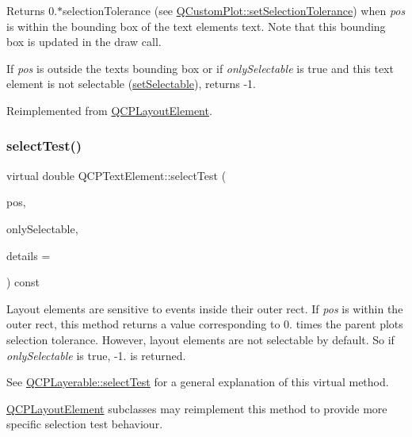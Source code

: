 Returns 0.$\ast$selection\+Tolerance (see \hyperlink{class_q_custom_plot_a4dc31241d7b09680950e19e5f971ed93}{Q\+Custom\+Plot\+::set\+Selection\+Tolerance}) when {\itshape pos} is within the bounding box of the text element\textquotesingle{}s text. Note that this bounding box is updated in the draw call.

If {\itshape pos} is outside the text\textquotesingle{}s bounding box or if {\itshape only\+Selectable} is true and this text element is not selectable (\hyperlink{class_q_c_p_text_element_a3c5f9b1897a036b16495ed3fb8371c55}{set\+Selectable}), returns -\/1.

Reimplemented from \hyperlink{class_q_c_p_layout_element_ae97f483cccedadbf18ea4525ef240ee4}{Q\+C\+P\+Layout\+Element}.

\mbox{\label{class_q_c_p_text_element_a29d2998b50ef369d88ca990b9d3542b3}} 
\subsubsection{\texorpdfstring{select\+Test()}{selectTest()}\hspace{0.1cm}{\footnotesize\ttfamily [2/2]}}
{\footnotesize\ttfamily virtual double Q\+C\+P\+Text\+Element\+::select\+Test (\begin{DoxyParamCaption}\item[{const Q\+PointF \&}]{pos,  }\item[{bool}]{only\+Selectable,  }\item[{Q\+Variant $\ast$}]{details = {} }\end{DoxyParamCaption}) const\hspace{0.3cm}{\ttfamily [virtual]}}

Layout elements are sensitive to events inside their outer rect. If {\itshape pos} is within the outer rect, this method returns a value corresponding to 0. times the parent plot\textquotesingle{}s selection tolerance. However, layout elements are not selectable by default. So if {\itshape only\+Selectable} is true, -\/1. is returned.

See \hyperlink{class_q_c_p_layerable_a04db8351fefd44cfdb77958e75c6288e}{Q\+C\+P\+Layerable\+::select\+Test} for a general explanation of this virtual method.

\hyperlink{class_q_c_p_layout_element}{Q\+C\+P\+Layout\+Element} subclasses may reimplement this method to provide more specific selection test behaviour. 

